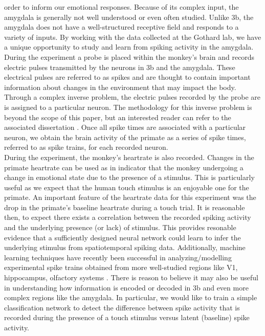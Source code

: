 \documentclass[12pt]{article}
\begin{document}
order to inform our emotional responses. Because of its complex input, the amygdala is generally not well understood or even often studied. Unlike 3b, the amygdala does not have a well-structured receptive field and responds to a variety of inputs. By working with the data collected at the Gothard lab, we have a unique opportunity to study and learn from spiking activity in the amygdala. \\
\indent During the experiment a probe is placed within the monkey's brain and records electric pulses transmitted by the neurons in 3b and the amygdala. These electrical pulses are referred to as spikes and are thought to contain important information about changes in the environment that may impact the body.  Through a complex inverse problem, the electric pulses recorded by the probe are is assigned to a particular
neuron. The methodology for this inverse problem is beyond the scope of this paper,
but an interested reader can refer to the associated dissertation \cite{greene}. Once all spike
times are associated with a particular neuron, we obtain the brain activity of the primate
as a series of spike times, referred to as spike trains, for each recorded neuron.  \\
\indent During the experiment, the monkey's heartrate is also recorded. Changes in the primate heartrate can be used as in indicator that the monkey undergoing a change in emotional state due to the presence of a stimulus. This is particularly useful as we expect that the human touch stimulus is an enjoyable one for the primate. An important feature of the heartrate data for this experiment was the drop in the primate's baseline heartrate during a touch trial. It is reasonable then, to expect there exists a correlation between the recorded spiking activity and the underlying presence (or lack) of stimulus. This provides resonable evidence that a sufficiently designed neural network could learn to infer the underlying stimulus from spatiotemporal spiking data. Additionally, machine learning techniques have recently been successful in analyzing/modelling experimental spike trains obtained from more well-studied regions like V1, hippocampus, olfactory systems \cite{laza} \cite{banino} \cite{stevens}. There is reason to believe it may also be useful in understanding how information is encoded or decoded in 3b and even more complex regions like the amygdala. In particular, we would like to train a simple classification network to detect the difference between spike activity that is recorded during the presence of a touch stimulus versus latent (baseline) spike activity. \\
\end{document}
